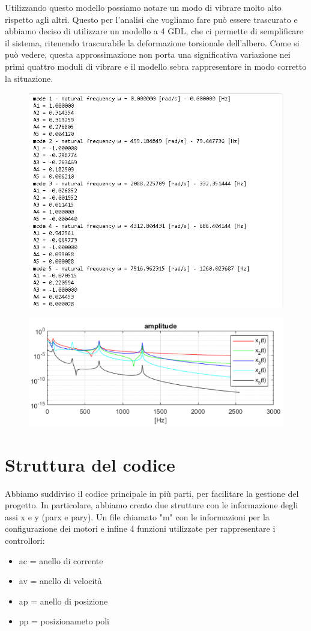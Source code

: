 \documentclass{article}
\begin{document}
Utilizzando questo modello possiamo notare un modo di vibrare molto alto rispetto agli altri. Questo per l'analisi che vogliamo fare può essere trascurato e abbiamo deciso di utilizzare un modello a 4 GDL, che ci permette di semplificare il sistema, ritenendo trascurabile la deformazione torsionale dell'albero.
Come si può vedere, questa approssimazione non porta una significativa variazione nei primi quattro moduli di vibrare e il modello sebra rappresentare in modo corretto la situazione.
\begin{figure}[H]
\centering
\includegraphics[width=.8\textwidth]{./assey/modi5.png}
\end{figure}
\begin{figure}[H]
\centering
\includegraphics[width=.8\textwidth]{./assey/ampiezzamodi5.png}
\end{figure}

\section{Struttura del codice}
Abbiamo suddiviso il codice principale in più parti, per facilitare la gestione del progetto. In particolare, abbiamo creato due strutture con le informazione degli assi x e y (parx e pary). Un file chiamato "m" con le informazioni per la configurazione dei motori e infine 4 funzioni utilizzate per rappresentare i controllori:
\begin{itemize}
    \item ac = anello di corrente
    \item av = anello di velocità
    \item ap = anello di posizione
    \item pp = posizionameto poli
\end{itemize}
\end{document}
